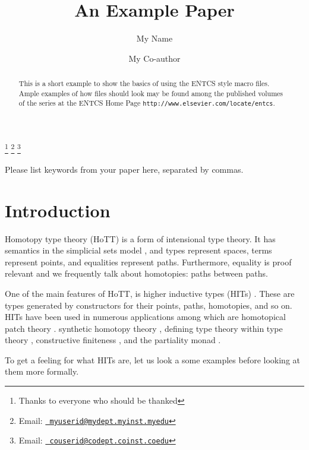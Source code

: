 \documentclass[9pt]{entcs}
\newcommand{\0}{\textbf{0}} %
\newcommand{\1}{\textbf{1}} %
\begin{document}
\begin{frontmatter}
  \title{An Example Paper} \author{My
    Name}
  \address{My Department\\ My University\\
    My City, My Country} \author{My Co-author}
  \address{My Co-author's Department\\My Co-author's University\\
    My Co-author's City, My Co-author's Country} \thanks[ALL]{Thanks
    to everyone who should be thanked} \thanks[myemail]{Email:
    \href{mailto:myuserid@mydept.myinst.myedu} {\texttt{\normalshape
        myuserid@mydept.myinst.myedu}}} \thanks[coemail]{Email:
    \href{mailto:couserid@codept.coinst.coedu} {\texttt{\normalshape
        couserid@codept.coinst.coedu}}}
\begin{abstract} 
  This is a short example to show the basics of using the ENTCS style
  macro files.  Ample examples of how files should look may be found
  among the published volumes of the series at the ENTCS Home Page
  \texttt{http://www.elsevier.com/locate/entcs}.
\end{abstract}
\begin{keyword}
  Please list keywords from your paper here, separated by commas.
\end{keyword}
\end{frontmatter}
\section{Introduction}
\label{intro}
Homotopy type theory (HoTT) is a form of intensional type theory. 
It has semantics in the simplicial sets model \cite{simpset}, and types represent spaces, terms represent points, and equalities represent paths.
Furthermore, equality is proof relevant and we frequently talk about homotopies: paths between paths.

One of the main features of HoTT, is higher inductive types (HITs) \cite{hottbook}.
These are types generated by constructors for their points, paths, homotopies, and so on.
HITs have been used in numerous applications among which are homotopical patch theory \cite{AngiuliMLH16}. synthetic homotopy theory \cite{LicataF14,LicataS13,hottbook}, defining type theory within type theory \cite{AltenkirchK16}, constructive finiteness \cite{FruminGGW18}, and the partiality monad \cite{AltenkirchDK17}.

To get a feeling for what HITs are, let us look a some examples before looking at them more formally.
\end{document}

